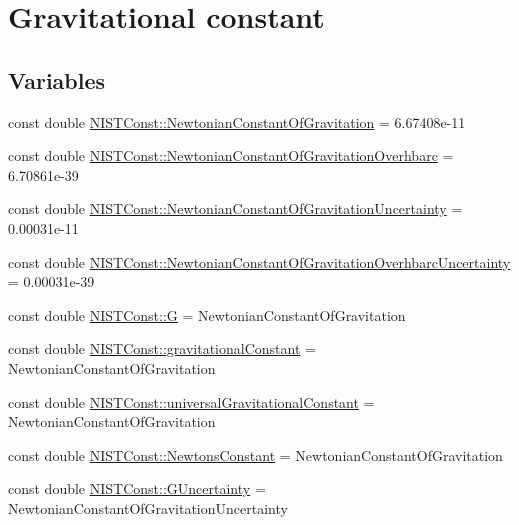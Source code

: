 \hypertarget{group___n_i_s_t_const-_gravitational_constant}{}\section{Gravitational constant}
\label{group___n_i_s_t_const-_gravitational_constant}
\subsection*{Variables}
\begin{DoxyCompactItemize}
\item 
const double \hyperlink{group___n_i_s_t_const-_gravitational_constant_gaba6371307f4cebde50b3c61a07c724c5}{N\+I\+S\+T\+Const\+::\+Newtonian\+Constant\+Of\+Gravitation} = 6.\+67408e-\/11
\item 
const double \hyperlink{group___n_i_s_t_const-_gravitational_constant_gad7c8d8ef09f60e8f3f36f86f98df0472}{N\+I\+S\+T\+Const\+::\+Newtonian\+Constant\+Of\+Gravitation\+Overhbarc} = 6.\+70861e-\/39
\item 
const double \hyperlink{group___n_i_s_t_const-_gravitational_constant_ga8fc40fce6dc42f5e84a3c908553e6586}{N\+I\+S\+T\+Const\+::\+Newtonian\+Constant\+Of\+Gravitation\+Uncertainty} = 0.\+00031e-\/11
\item 
const double \hyperlink{group___n_i_s_t_const-_gravitational_constant_gaf10cbbd8ad1ece4ec01e35fe3d86854f}{N\+I\+S\+T\+Const\+::\+Newtonian\+Constant\+Of\+Gravitation\+Overhbarc\+Uncertainty} = 0.\+00031e-\/39
\item 
const double \hyperlink{group___n_i_s_t_const-_gravitational_constant_gad3f54a7cdc3ea6fd2fbc4a30ce7df201}{N\+I\+S\+T\+Const\+::G} = Newtonian\+Constant\+Of\+Gravitation
\item 
const double \hyperlink{group___n_i_s_t_const-_gravitational_constant_ga5a77947aedbfa6b29249f5b25f22137b}{N\+I\+S\+T\+Const\+::gravitational\+Constant} = Newtonian\+Constant\+Of\+Gravitation
\item 
const double \hyperlink{group___n_i_s_t_const-_gravitational_constant_ga8d7552c043dbeda8e536ba6a01af9829}{N\+I\+S\+T\+Const\+::universal\+Gravitational\+Constant} = Newtonian\+Constant\+Of\+Gravitation
\item 
const double \hyperlink{group___n_i_s_t_const-_gravitational_constant_ga3d83beb8e9a1e0970e5520fe8ca1ace5}{N\+I\+S\+T\+Const\+::\+Newtons\+Constant} = Newtonian\+Constant\+Of\+Gravitation
\item 
const double \hyperlink{group___n_i_s_t_const-_gravitational_constant_gaf812b3fa9a3fa9f4ea48f77e00d3b205}{N\+I\+S\+T\+Const\+::\+G\+Uncertainty} = Newtonian\+Constant\+Of\+Gravitation\+Uncertainty

\end{DoxyCompactItemize}
